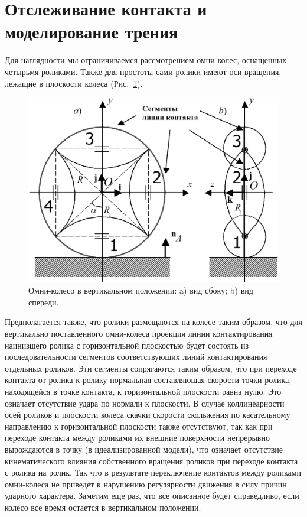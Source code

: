 \section{Отслеживание контакта и моделирование трения}

Для наглядности мы ограничиваемся рассмотрением омни-колес, 
оснащенных четырьмя роликами. Также для простоты сами ролики имеют оси 
вращения, лежащие в плоскости колеса (Рис.~\ref{OmniWheel}).

\begin{figure}[htb]
\centering\includegraphics[width=13cm]{content/parts/3_friction/nd/OmniWheel.eps}
\caption{Омни-колесо в вертикальном положении: a) вид сбоку; b) вид спереди.}
\label{OmniWheel}
\end{figure}

Предполагается также, что ролики размещаются на колесе таким образом, что для 
вертикально поставленного омни-колеса проекция линии контактирования наинизшего 
ролика с горизонтальной плоскостью будет состоять из последовательности 
сегментов соответствующих линий контактирования отдельных роликов. Эти сегменты 
сопрягаются таким образом, что при переходе контакта от ролика к ролику 
нормальная составляющая скорости точки ролика, находящейся в точке контакта, к 
горизонтальной плоскости равна нулю. Это означает отсутствие удара по нормали к 
плоскости. В случае коллинеарности осей роликов и плоскости колеса скачки 
скорости скольжения по касательному направлению к горизонтальной плоскости 
также отсутствуют, так как при переходе контакта между роликами их внешние 
поверхности непрерывно вырождаются в точку (в идеализированной модели), что 
означает отсутствие кинематического влияния собственного вращения роликов при 
переходе контакта с ролика на ролик. Так что в результате переключение 
контактов между роликами омни-колеса не приведет к нарушению регулярности 
движения в силу причин ударного характера. Заметим еще раз, что все описанное 
будет справедливо, если колесо все время остается в вертикальном положении.

